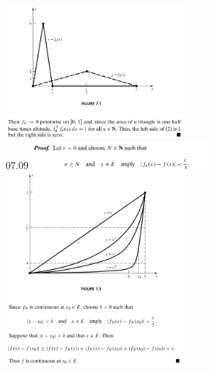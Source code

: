 \documentclass[3pt,landscape]{article}
\begin{document}
\begin{multicols}{3}
    \includegraphics[width=250]{07_06b.png} \\
    07.09
    \includegraphics[width=250]{07_09a.png} \\
    \includegraphics[width=250]{07_09b.png} \\

\end{multicols}
\end{document}
